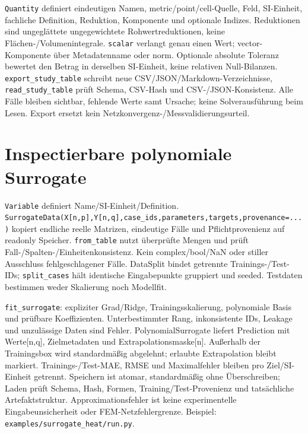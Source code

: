 \texttt{Quantity} definiert eindeutigen Namen, metric/point/cell-Quelle, Feld,
SI-Einheit, fachliche Definition, Reduktion, Komponente und optionale Indizes.
Reduktionen sind ungeglättete ungegewichtete Rohwertreduktionen, keine
Flächen-/Volumenintegrale. \texttt{scalar} verlangt genau einen Wert;
vector-Komponente über Metadatenname oder norm. Optionale absolute Toleranz
bewertet den Betrag in derselben SI-Einheit, keine relativen Null-Bilanzen.
\texttt{export\_study\_table} schreibt neue CSV/JSON/Markdown-Verzeichnisse,
\texttt{read\_study\_table} prüft Schema, CSV-Hash und CSV-/JSON-Konsistenz.
Alle Fälle bleiben sichtbar, fehlende Werte samt Ursache; keine Solverausführung
beim Lesen. Export ersetzt kein Netzkonvergenz-/Messvalidierungsurteil.

\section{Inspectierbare polynomiale Surrogate}
\texttt{Variable} definiert Name/SI-Einheit/Definition.
\texttt{SurrogateData(X[n,p],Y[n,q],case\_ids,parameters,targets,provenance=...)}
kopiert endliche reelle Matrizen, eindeutige Fälle und Pflichtprovenienz auf
readonly Speicher. \texttt{from\_table} nutzt überprüfte Mengen und
prüft Fall-/Spalten-/Einheitenkonsistenz. Kein complex/bool/NaN oder stiller
Ausschluss fehlgeschlagener Fälle. DataSplit bindet getrennte Trainings-/Test-
IDs; \texttt{split\_cases} hält identische Eingabepunkte gruppiert und seeded.
Testdaten bestimmen weder Skalierung noch Modellfit.

\texttt{fit\_surrogate}: expliziter Grad/Ridge, Trainingsskalierung,
polynomiale Basis und prüfbare Koeffizienten. Unterbestimmter Rang,
inkonsistente IDs, Leakage und unzulässige Daten sind Fehler.
PolynomialSurrogate liefert Prediction mit Werte[n,q], Zielmetadaten und
Extrapolationsmaske[n]. Außerhalb der Trainingsbox wird standardmäßig
abgelehnt; erlaubte Extrapolation bleibt markiert. Trainings-/Test-MAE,
RMSE und Maximalfehler bleiben pro Ziel/SI-Einheit getrennt.
Speichern ist atomar, standardmäßig ohne Überschreiben; Laden prüft Schema,
Hash, Formen, Training/Test-Provenienz und tatsächliche Artefaktstruktur.
Approximationsfehler ist keine experimentelle Eingabeunsicherheit oder
FEM-Netzfehlergrenze. Beispiel: \nolinkurl{examples/surrogate_heat/run.py}.

